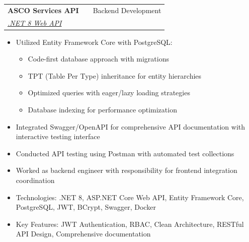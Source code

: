 \documentclass[a4paper,12pt]{article}
\makeatletter
\newenvironment{projectdetailed}[3]
    {
    \begin{tabularx}{\linewidth}{@{}l X r@{}}
    \textbf{#1} & \hfill & #2 \\
    \textit{#3} & & \\[3.75pt]
    \end{tabularx}
    \begin{minipage}[t]{\linewidth}
    \begin{itemize}[nosep,after=\strut, leftmargin=1em, itemsep=2pt,label=--]
    }
    {
    \end{itemize}
    \end{minipage}
    \vspace{6pt}
    }
\makeatother
\begin{document}
\begin{projectdetailed}{ASCO Services API}{Backend Development}{\href{https://github.com/}{.NET 8 Web API}}
\begin{itemize}[nosep, leftmargin=2em]
    \item Multi-tenant architecture support
    \item Organization-user relationship management
    \item Organization-level permissions and settings
\end{itemize}
\item Utilized Entity Framework Core with PostgreSQL:
\begin{itemize}[nosep, leftmargin=2em]
    \item Code-first database approach with migrations
    \item TPT (Table Per Type) inheritance for entity hierarchies
    \item Optimized queries with eager/lazy loading strategies
    \item Database indexing for performance optimization
\end{itemize}
\item Integrated Swagger/OpenAPI for comprehensive API documentation with interactive testing interface
\item Conducted API testing using Postman with automated test collections
\item Worked as backend engineer with responsibility for frontend integration coordination
\item Technologies: .NET 8, ASP.NET Core Web API, Entity Framework Core, PostgreSQL, JWT, BCrypt, Swagger, Docker
\item Key Features: JWT Authentication, RBAC, Clean Architecture, RESTful API Design, Comprehensive documentation
\end{projectdetailed}
\end{document}
